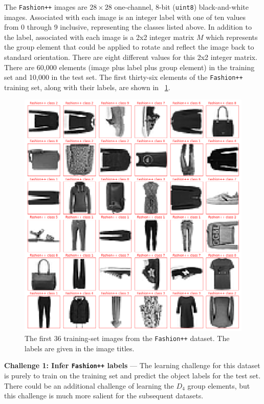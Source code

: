 \documentclass{article}
\renewcommand{\paragraph}[1]{\par\medskip\noindent\textbf{#1} ---}
\newcommand{\figref}[1]{\figurename~\ref{#1}}
\begin{document}
The \texttt{Fashion++} images are $28\times 28$ one-channel, 8-bit (\texttt{uint8}) black-and-white images.
Associated with each image is an integer label with one of ten values from 0 through 9 inclusive, representing the classes listed above.
In addition to the label, associated with each image is a 2x2 integer matrix $M$ which represents the group element that could be applied to rotate and reflect the image back to standard orientation.
There are eight different values for this 2x2 integer matrix.
There are 60,000 elements (image plus label plus group element) in the training set and 10,000 in the test set.
The first thirty-six elements of the \texttt{Fashion++} training set, along with their labels, are shown in \figref{fig:f}.
\begin{figure}[t!]
\includegraphics[width=\textwidth]{../notebooks/Fashion++.png}
\caption{The first 36 training-set images from the \texttt{Fashion++} dataset. The labels are given in the image titles.\label{fig:f}}
\end{figure}

\paragraph{Challenge 1: Infer \texttt{Fashion++} labels}
The learning challenge for this dataset is purely to train on the training set and predict the object labels for the test set. There could be an additional challenge of learning the $D_4$ group elements, but this challenge is much more salient for the subsequent datasets.
\end{document}
